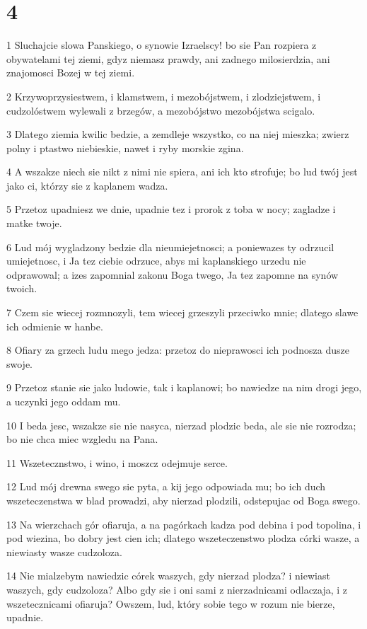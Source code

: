 \chapter{4}

\par 1 Sluchajcie slowa Panskiego, o synowie Izraelscy! bo sie Pan rozpiera z obywatelami tej ziemi, gdyz niemasz prawdy, ani zadnego milosierdzia, ani znajomosci Bozej w tej ziemi.
\par 2 Krzywoprzysiestwem, i klamstwem, i mezobójstwem, i zlodziejstwem, i cudzolóstwem wylewali z brzegów, a mezobójstwo mezobójstwa scigalo.
\par 3 Dlatego ziemia kwilic bedzie, a zemdleje wszystko, co na niej mieszka; zwierz polny i ptastwo niebieskie, nawet i ryby morskie zgina.
\par 4 A wszakze niech sie nikt z nimi nie spiera, ani ich kto strofuje; bo lud twój jest jako ci, którzy sie z kaplanem wadza.
\par 5 Przetoz upadniesz we dnie, upadnie tez i prorok z toba w nocy; zagladze i matke twoje.
\par 6 Lud mój wygladzony bedzie dla nieumiejetnosci; a poniewazes ty odrzucil umiejetnosc, i Ja tez ciebie odrzuce, abys mi kaplanskiego urzedu nie odprawowal; a izes zapomnial zakonu Boga twego, Ja tez zapomne na synów twoich.
\par 7 Czem sie wiecej rozmnozyli, tem wiecej grzeszyli przeciwko mnie; dlatego slawe ich odmienie w hanbe.
\par 8 Ofiary za grzech ludu mego jedza: przetoz do nieprawosci ich podnosza dusze swoje.
\par 9 Przetoz stanie sie jako ludowie, tak i kaplanowi; bo nawiedze na nim drogi jego, a uczynki jego oddam mu.
\par 10 I beda jesc, wszakze sie nie nasyca, nierzad plodzic beda, ale sie nie rozrodza; bo nie chca miec wzgledu na Pana.
\par 11 Wszetecznstwo, i wino, i moszcz odejmuje serce.
\par 12 Lud mój drewna swego sie pyta, a kij jego odpowiada mu; bo ich duch wszeteczenstwa w blad prowadzi, aby nierzad plodzili, odstepujac od Boga swego.
\par 13 Na wierzchach gór ofiaruja, a na pagórkach kadza pod debina i pod topolina, i pod wiezina, bo dobry jest cien ich; dlatego wszeteczenstwo plodza córki wasze, a niewiasty wasze cudzoloza.
\par 14 Nie mialzebym nawiedzic córek waszych, gdy nierzad plodza? i niewiast waszych, gdy cudzoloza? Albo gdy sie i oni sami z nierzadnicami odlaczaja, i z wszetecznicami ofiaruja? Owszem, lud, który sobie tego w rozum nie bierze, upadnie.
